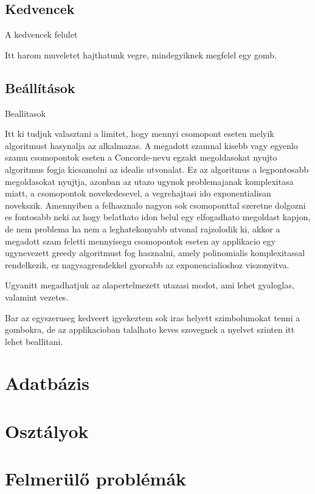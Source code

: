 \subsection{Kedvencek}
A kedvencek felulet

Itt harom muveletet hajthatunk vegre, mindegyiknek megfelel egy gomb.

\subsection{Beállítások}
Beallitasok

Itt ki tudjuk valasztani a limitet, hogy mennyi csomopont eseten melyik algoritmust hasynalja az alkalmazas.
A megadott szamnal kisebb vagy egyenlo szamu csomopontok eseten a Concorde-nevu egzakt megoldasokat nyujto algoritmus fogja kicsamolni az idealis utvonalat.
Ez az algoritmus a legpontosabb megoldasokat nyujtja, azonban az utazo ugynok problemajanak komplexitasa miatt, a csomopontok novekedesevel, a vegrehajtasi ido exponentialisan novekszik.
Amennyiben a felhasznalo nagyon sok csomoponttal szeretne dolgozni es fontosabb neki az hogy belathato idon belul egy elfogadhato megoldast kapjon, de nem problema ha nem a leghatekonyabb utvonal rajzolodik ki,
akkor a megadott szam feletti mennyisegu csomopontok eseten ay applikacio egy ugynevezett greedy algoritmust fog hasznalni, amely polinomialis komplexitassal rendelkezik, ez nagysagrendekkel gyorsabb az exponencialioshoz viszonyitva.

Ugyanitt megadhatjuk az alapertelmezett utazasi modot, ami lehet gyaloglas, valamint vezetes.

Bar az egyszeruseg kedveert igyekeztem sok iras helyett szimbolumokat tenni a gombokra, de az applikacioban talalhato keves szovegnek a nyelvet szinten itt lehet beallitani.

\section{Adatbázis}\label{sec:ALAP:adatelem}

\section{Osztályok}\label{sec:ALAP:adatelem}

\section{Felmerülő problémák}\label{sec:ALAP:adatelem}

